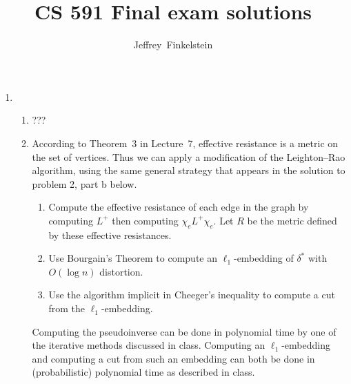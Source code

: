 \documentclass{article}
\author{Jeffrey~Finkelstein}
\title{CS 591 Final exam solutions}
\newcommand{\0}{\mathbf{0}}
\begin{document}
\maketitle


\begin{enumerate}
\item
  \begin{enumerate}
  \item ???
  \item
    According to Theorem~3 in Lecture~7, effective resistance is a metric on the set of vertices.
    Thus we can apply a modification of the Leighton--Rao algorithm, using the same general strategy that appears in the solution to problem 2, part b below.
    \begin{enumerate}
    \item
      Compute the effective resistance of each edge in the graph by computing $L^+$ then computing $\chi_e L^+ \chi_e$.
      Let $R$ be the metric defined by these effective resistances.
    \item Use Bourgain's Theorem to compute an $\ell_1$-embedding of $\delta^*$ with $O(\log n)$ distortion.
    \item Use the algorithm implicit in Cheeger's inequality to compute a cut from the $\ell_1$-embedding.
    \end{enumerate}
    Computing the pseudoinverse can be done in polynomial time by one of the iterative methods discussed in class.
    Computing an $\ell_1$-embedding and computing a cut from such an embedding can both be done in (probabilistic) polynomial time as described in class.


\end{enumerate}
\end{enumerate}
\end{document}
